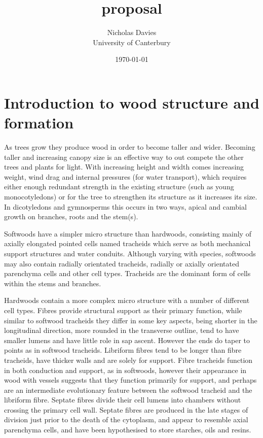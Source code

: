 \documentclass{article}
\begin{document}
\title{proposal}

\author{Nicholas Davies\\ University of Canterbury }

\date{\today}



\maketitle

\section{Introduction to wood structure and formation}
As trees grow they produce wood in order to become taller and wider. Becoming
taller and increasing canopy size is an effective way to out compete the other
trees and plants for light. With increasing height and width comes increasing
weight, wind drag and internal pressures (for water transport), which requires
either enough redundant strength in the existing structure (such as young monocotyledons) or
for the tree to strengthen its structure as it increases its size. In
dicotyledons and gymnosperms this occurs in two ways, apical and cambial growth
on branches, roots and the stem(s).

Softwoods have a simpler micro structure than hardwoods, consisting mainly of
axially elongated pointed cells named tracheids which serve as both mechanical
support structures and water conduits. Although varying with species, softwoods
may also contain radially orientated tracheids, radially or axially orientated
parenchyma cells and other cell types. Tracheids are the dominant form of cells
within the stems and branches.

Hardwoods contain a more complex micro structure with a number
of different cell types. Fibres provide structural support as their primary
function, while similar to softwood tracheids they differ in some key aspects,
being shorter in the longitudinal direction, more rounded in the transverse
outline, tend to have smaller lumens and have little role in sap ascent.
However the ends do taper to points as in softwood tracheids. Libriform fibres tend to
be longer than fibre tracheids, have thicker walls and are solely for support.
Fibre tracheids function in both conduction and support, as in softwoods,
however their appearance in wood with vessels suggests that they function
primarily for support, and perhaps are an intermediate evolutionary feature
between the softwood tracheid and the libriform fibre. Septate fibres divide
their cell lumens into chambers without crossing the primary cell wall. Septate
fibres are produced in the late stages of division just prior to the death of
the cytoplasm, and appear to resemble axial parenchyma cells, and have been
hypothesised to store starches, oils and resins.
\end{document}
